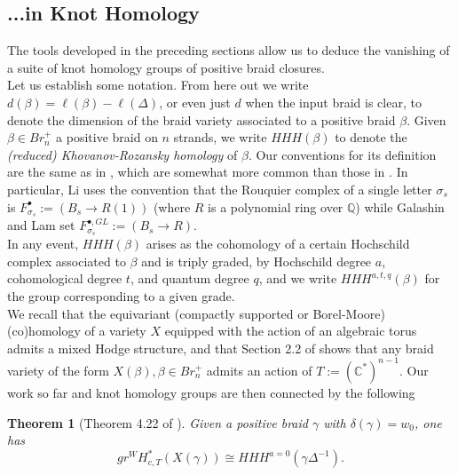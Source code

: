 \documentclass[11pt]{amsart}
\newtheorem{thm}{Theorem}[section]
\theoremstyle{definition}
\theoremstyle{remark}
\numberwithin{equation}{section}
\begin{document}
\subsection{...in Knot Homology}\label{subsection 6.1}

The tools developed in the preceding sections allow us to deduce the vanishing of a suite of knot homology groups of positive braid closures.\\

Let us establish some notation. From here out we write $d(\beta) = \ell(\beta) - \ell(\Delta)$, or even just $d$ when the input braid is clear, to denote the dimension of the braid variety associated to a positive braid $\beta$.  Given $\beta \in Br_n^+$ a positive braid on $n$ strands, we write $HHH(\beta)$ to denote the \textit{(reduced) Khovanov-Rozansky homology} of $\beta$. Our conventions for its definition are the same as in \cite{li2025last}, which are somewhat more common than those in \cite{MR4809331}. In particular, Li uses the convention that the Rouquier complex of a single letter $\sigma_s$ is $F_{\sigma_s}^\bullet := (B_s \rightarrow R(1))$ (where $R$ is a polynomial ring over $\mathbb{Q}$) while Galashin and Lam set $F_{\sigma_s}^{\bullet, GL} := (B_s \rightarrow R)$.\\

In any event, $HHH(\beta)$ arises as the cohomology of a certain Hochschild complex associated to $\beta$ and is triply graded, by Hochschild degree $a$, cohomological degree $t$, and quantum degree $q$, and we write $HHH^{a, t, q}(\beta)$ for the group corresponding to a given grade.\\

We recall that the equivariant (compactly supported or Borel-Moore) (co)homology of a variety $X$ equipped with the action of an algebraic torus admits a mixed Hodge structure, and that Section 2.2 of \cite{MR5110495} shows that any braid variety of the form $X(\beta), \beta \in Br_n^+$ admits an action of $T := (\mathbb{C}^*)^{n-1}$. Our work so far and knot homology groups are then connected by the following

\begin{thm}[Theorem 4.22 of \cite{MR5110495}]\label{HHH equivariant cohom}
Given a positive braid $\gamma$ with $\delta(\gamma) = w_0$, one has
    \begin{equation}
        gr^WH_{c, T}^*(X(\gamma)) \cong HHH^{a = 0}(\gamma \Delta^{-1}).
    \end{equation}
\end{thm}
\end{document}
